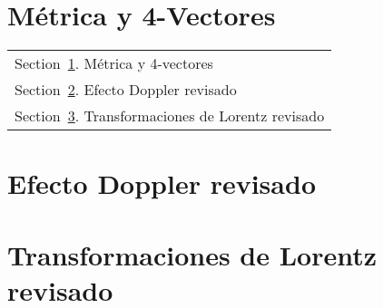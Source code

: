 \documentclass[../main]{subfiles}
\begin{document}
\section{Métrica y 4-Vectores}\label{Sec:4-vec}
        \begin{margintable}\vspace{1.4in}\footnotesize
		\begin{tabularx}{\marginparwidth}{|X}
        Section~\ref{Sec:4-vec}. Métrica y 4-vectores\\
        Section~\ref{Sec:DoplRev}. Efecto Doppler revisado\\
        Section~\ref{Sec:LorentzRev}. Transformaciones de Lorentz revisado\\
		\end{tabularx}
        \end{margintable}

        \lipsum[1]
    \begin{adjustwidth}{0pt}{-100pt}
    
        \section{Efecto Doppler revisado}\label{Sec:DoplRev}
            \lipsum[1]

        \section{Transformaciones de Lorentz revisado}\label{Sec:LorentzRev}
            \lipsum[1]

    \end{adjustwidth}
\end{document}
